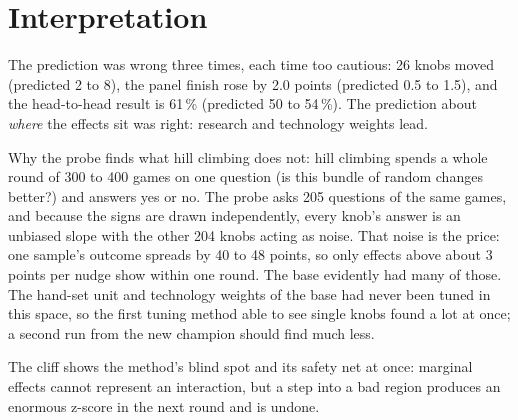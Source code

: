 \documentclass{../polyexp}
\begin{document}

\section{Interpretation}
The prediction was wrong three times, each time too cautious: 26 knobs moved (predicted 2 to 8), the panel finish rose by 2.0 points (predicted 0.5 to 1.5), and the head-to-head result is 61\,\% (predicted 50 to 54\,\%). The prediction about \emph{where} the effects sit was right: research and technology weights lead.

Why the probe finds what hill climbing does not: hill climbing spends a whole round of 300 to 400 games on one question (is this bundle of random changes better?) and answers yes or no. The probe asks 205 questions of the same games, and because the signs are drawn independently, every knob's answer is an unbiased slope with the other 204 knobs acting as noise. That noise is the price: one sample's outcome spreads by 40 to 48 points, so only effects above about 3 points per nudge show within one round. The base evidently had many of those. The hand-set unit and technology weights of the base had never been tuned in this space, so the first tuning method able to see single knobs found a lot at once; a second run from the new champion should find much less.

The cliff shows the method's blind spot and its safety net at once: marginal effects cannot represent an interaction, but a step into a bad region produces an enormous z-score in the next round and is undone.

\end{document}
